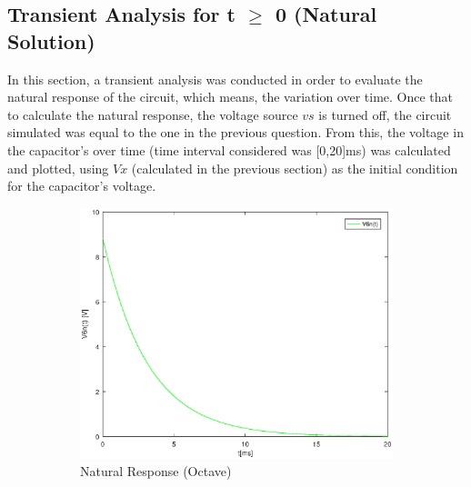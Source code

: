 \subsection{Transient Analysis for t $\geq$ 0 (Natural Solution)}

In this section, a transient analysis was conducted in order to evaluate the natural response of the circuit, which means, the variation over time. Once that to calculate the natural response, the voltage source $vs$ is turned off, the circuit simulated was equal to the one in the previous question. From this, the voltage in the capacitor's over time (time interval considered was [0,20]ms) was calculated and plotted, using $Vx$ (calculated in the previous section) as the initial condition for the capacitor's voltage.

\begin{figure}[H] 
\centering
\begin{subfigure}{0.35\textwidth}
\includegraphics[width=\textwidth]{NaturalResponse.eps}
\caption{Natural Response (Octave)}
\label{fig:first}
\end{subfigure}
\begin{subfigure}{0.25\textwidth}

\end{subfigure}
\end{figure}

